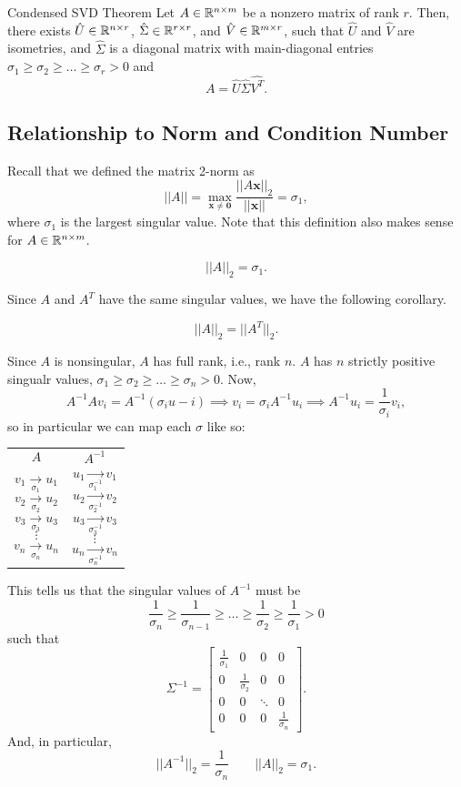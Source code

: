 \documentclass[letterpaper]{article}
\newcommand{\0}{\mathbf{0}}
\newcommand{\x}{\mathbf{x}}
\begin{document}
\begin{theorem}{Condensed SVD Theorem}{}
    Let $A \in \mathbb{R}^{n \times m}$ be a nonzero matrix of rank $r$. Then, there exists $\hat{U} \in \mathbb{R}^{n \times r}$, $\hat{\Sigma} \in \mathbb{R}^{r \times r}$, and $\hat{V} \in \mathbb{R}^{m \times r}$, such that $\hat{U}$ and $\hat{V}$ are isometries, and $\hat{\Sigma}$ is a diagonal matrix with main-diagonal entries $\sigma_1 \geq \sigma_2 \geq \hdots \geq \sigma_r > 0$ and \[A = \hat{U}\hat{\Sigma}\hat{V^T}.\]
\end{theorem}


\subsection{Relationship to Norm and Condition Number}
Recall that we defined the matrix 2-norm as  
\[||A|| = \max_{\x \neq \0} \frac{||A\x||_2}{||\x||} = \sigma_1,\] where $\sigma_1$ is the largest singular value. Note that this definition also makes sense for $A \in \mathbb{R}^{n \times m}$. 

\begin{theorem}{}{}
    \[||A||_2 = \sigma_1.\]
\end{theorem}

Since $A$ and $A^T$ have the same singular values, we have the following corollary. 
\begin{corollary}{}{}
    \[||A||_2 = ||A^T||_2.\]
\end{corollary}
Since $A$ is nonsingular, $A$ has full rank, i.e., rank $n$. $A$ has $n$ strictly positive singualr values, $\sigma_1 \geq \sigma_2 \geq \hdots \geq \sigma_n > 0$. Now, 
\[A^{-1} Av_i = A^{-1}(\sigma_i u-i) \implies v_i = \sigma_i A^{-1} u_i \implies A^{-1} u_i = \frac{1}{\sigma_i} v_i,\] so in particular we can map each $\sigma$ like so: 
\begin{center}
    \begin{tabular}{p{2in} p{2in}}
        \[A\] & \[A^{-1}\] \\ 
        \[v_1 \xrightarrow[\sigma_1]{} u_1\]
        \[v_2 \xrightarrow[\sigma_2]{} u_2\]
        \[v_3 \xrightarrow[\sigma_3]{} u_3\]
        \[\vdots\]
        \[v_n \xrightarrow[\sigma_n]{} u_n\] &
        \[u_1 \xrightarrow[\sigma_1^{-1}]{} v_1\]
        \[u_2 \xrightarrow[\sigma_2^{-1}]{} v_2\]
        \[u_3 \xrightarrow[\sigma_3^{-1}]{} v_3\]
        \[\vdots\]
        \[u_{n} \xrightarrow[\sigma_n^{-1}]{} v_n\]
    \end{tabular}
\end{center}
This tells us that the singular values of $A^{-1}$ must be \[\frac{1}{\sigma_n} \geq \frac{1}{\sigma_{n - 1}} \geq \hdots \geq \frac{1}{\sigma_2} \geq \frac{1}{\sigma_1} > 0\]
such that 
\[\Sigma^{-1} = \begin{bmatrix}
    \frac{1}{\sigma_1} & 0 & 0 & 0 \\ 
    0 & \frac{1}{\sigma_2} & 0 & 0 \\ 
    0 & 0 & \ddots & 0 \\ 
    0 & 0 & 0 & \frac{1}{\sigma_n} 
\end{bmatrix}.\]
And, in particular, \[||A^{-1}||_2 = \frac{1}{\sigma_n} \qquad ||A||_2 = \sigma_1.\]
\end{document}
